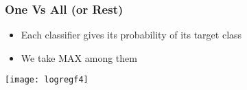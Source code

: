\begin{frame}[fragile]\frametitle{One Vs All (or Rest)}
\begin{itemize}
\item Each classifier gives its probability of its target class
\item We take MAX among them
\end{itemize}
\begin{center}
\texttt{[image: logregf4]}
\end{center}
\end{frame}


%
